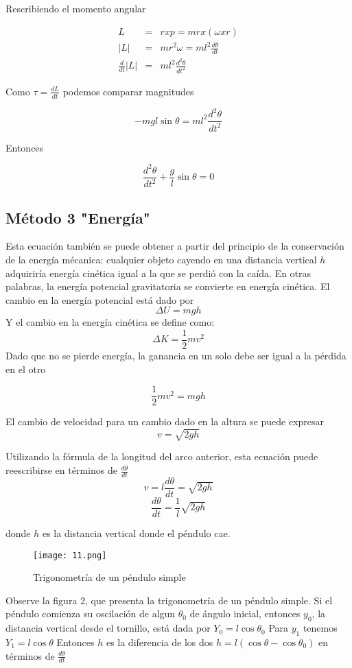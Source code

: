 \documentclass[12pt]{article}
\begin{document}
Rescribiendo el momento angular

\begin{eqnarray}
\nonumber L & = & r x p = mr x (\omega x r) \\
\nonumber |L| & = & mr^2 \omega = ml^2 \frac{d\theta}{dt} \\
\nonumber \frac{d}{dt} |L|&  = & ml^2\frac{d^2\theta}{dt^2} 
\end{eqnarray}

Como $\tau = \frac{dL}{dt}$ podemos comparar magnitudes


$$ -mgl\sin\theta =  ml^2\frac{d^2\theta}{dt^2} $$

Entonces 

\begin{equation}
\nonumber \frac{d^2\theta}{dt^2}+\frac{g}{l}\sin\theta=0
\end{equation}

\subsection{Método 3 "Energía"}
Esta ecuación también se puede obtener a partir del principio de  la conservación de la energía mécanica: cualquier objeto cayendo en una distancia vertical $h$ adquiriría energía cinética igual a la que se perdió con la caída. En otras palabras, la energía potencial gravitatoria se convierte en energía cinética. El cambio en la energía potencial está dado por 
$$\Delta U = mgh$$ 
Y el cambio en la energía cinética se define como:
$$\Delta K = \frac{1}{2}mv^2$$
Dado que no se pierde energía, la ganancia en un solo debe ser igual a la pérdida en el otro

$$\frac{1}{2}mv^2=mgh$$

El cambio de velocidad para un cambio dado en la altura se puede expresar
$$v=\sqrt{2gh}$$

Utilizando la fórmula de la longitud del arco anterior, esta ecuación puede reescribirse en términos de $\frac{d\theta}{dt}$
$$v=l\frac{d\theta}{dt}=\sqrt{2gh}$$
$$\frac{d\theta}{dt}= \frac{1}{l}\sqrt{2gh}$$

donde $h$ es la distancia vertical donde el péndulo cae.

\begin{figure}[H]
	\centering
	\texttt{[image: 11.png]}
	\caption{Trigonometría de un péndulo simple}
\end{figure}

Observe la figura 2, que presenta la trigonometría de un péndulo simple. Si el péndulo comienza su oscilación de algun $\theta_0$ de ángulo inicial, entonces $y_0$, la distancia vertical desde el tornillo, está dada por
$Y_0=l\cos\theta_0$
Para $y_1$ tenemos
$Y_1=l\cos\theta$
Entonces $h$ es la diferencia de los dos
$h=l(\cos\theta-\cos\theta_0)$
en términos de $\frac{d\theta}{dt}$
\end{document}
